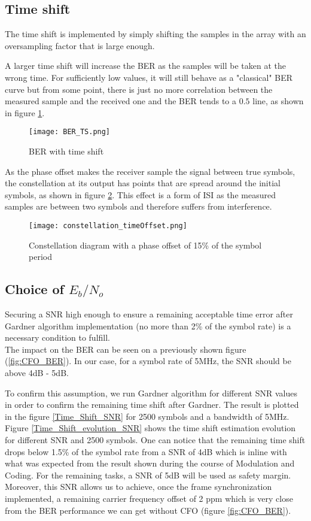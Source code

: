 \subsection{Time shift}
The time shift is implemented by simply shifting the samples in the array with an oversampling factor that is large enough. \par
A larger time shift will increase the BER as the samples will be taken at the wrong time. For sufficiently low values, it will still behave as a "classical" BER curve but from some point, there is just no more correlation between the measured sample and the received one and the BER tends to a $0.5$ line, as shown in figure \ref{fig:BER_TS}. \par

\begin{figure}[H]
    \centering
    \texttt{[image: BER\_TS.png]}
    \caption{BER with time shift}
    \label{fig:BER_TS}
\end{figure}

As the phase offset makes the receiver sample the signal between true symbols, the constellation at its output has points that are spread around the initial symbols, as shown in figure \ref{fig:phaseShiftConst}. This effect is a form of ISI as the measured samples are between two symbols and therefore suffers from interference.

\begin{figure}[H]
    \centering
    \texttt{[image: constellation\_timeOffset.png]}
    \caption{Constellation diagram with a phase offset of 15\% of the symbol period}
    \label{fig:phaseShiftConst}
\end{figure}

\subsection{Choice of $E_{b}/N_{o}$}
Securing a SNR high enough to ensure a remaining acceptable time error after Gardner algorithm implementation
 (no more than 2\% of the symbol rate) is a necessary condition to fulfill.\\
The impact on the BER can be seen on a previously shown figure (\ref{fig:CFO_BER}).
In our case, for a symbol rate of 5MHz, the SNR should be above 4dB - 5dB.

To confirm this assumption, we run Gardner algorithm for different SNR values in order to confirm the remaining time shift after
Gardner.  The result is plotted in the figure \ref{Time_Shift_SNR} for 2500 symbols and a bandwidth of 5MHz.
Figure \ref{Time_Shift_evolution_SNR} shows the time shift estimation evolution for different SNR and 2500 symbols. 
 One can notice that the remaining time shift drops below 1.5\% of the symbol rate from a SNR of 4dB which is inline with what 
 was expected from the result shown during the course of Modulation and Coding.  For the remaining tasks, a SNR of 5dB will be 
 used as safety margin.
Moreover, this SNR allows us to achieve, once the frame synchronization implemented, a remaining carrier frequency offset
of 2 ppm which is very close from the BER performance we can get without CFO (figure \ref{fig:CFO_BER}).

